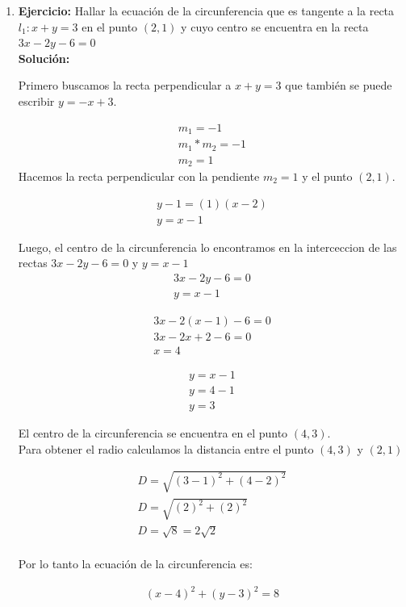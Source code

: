\documentclass[a4paper,10pt]{article}
\begin{document}
\begin{enumerate}
\newpage

\item \textbf{Ejercicio:} Hallar la ecuación de la circunferencia que es tangente a la recta $l_1:x+y=3$ en el punto $(2,1)$ y cuyo centro se encuentra en la recta $3x-2y-6=0$\\

\textbf{Solución:}

Primero buscamos la recta perpendicular a $x+y=3$ que también se puede escribir $y=-x+3$.

\begin{gather*}
m_1 = -1\\
m_1 * m_2= -1\\
m_2 = 1
\end{gather*}
Hacemos la recta perpendicular con la pendiente $m_2= 1$ y el punto $(2,1)$.

\begin{gather*}
y-1= (1)(x-2)\\
y=x-1
\end{gather*}

Luego, el centro de la circunferencia lo encontramos en la interceccion de las rectas $3x-2y-6=0$ y $y=x-1$
\begin{gather*}
3x-2y-6=0\\
y=x-1
\end{gather*}

\begin{gather*}
3x-2(x-1)-6=0\\
3x-2x+2-6=0\\
x=4
\end{gather*}

\begin{gather*}
y=x-1\\
y=4-1\\
y=3
\end{gather*}

El centro de la circunferencia se encuentra en el punto $(4,3)$.\\

Para obtener el radio calculamos la distancia entre el punto $(4,3)$ y $(2,1)$

\begin{gather*}
D= \sqrt{(3-1)^2+(4-2)^2}\\
D= \sqrt{(2)^2+(2)^2}\\
D= \sqrt{8} = 2\sqrt{2}\\
\end{gather*}

Por lo tanto la ecuación de la circunferencia es:

\begin{gather*}
(x-4)^2+(y-3)^2=8
\end{gather*}


 \end{enumerate}
\end{document}
